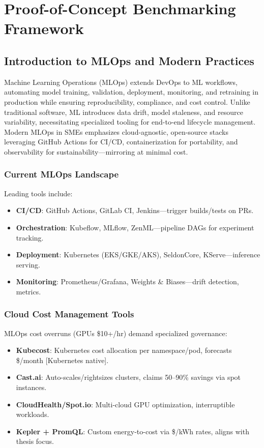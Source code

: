 \chapter{Proof-of-Concept Benchmarking Framework}

\section{Introduction to MLOps and Modern Practices}

Machine Learning Operations (MLOps) extends DevOps to ML workflows, automating model training, validation, deployment, monitoring, and retraining in production while ensuring reproducibility, compliance, and cost control. Unlike traditional software, ML introduces data drift, model staleness, and resource variability, necessitating specialized tooling for end-to-end lifecycle management. Modern MLOps in SMEs emphasizes cloud-agnostic, open-source stacks leveraging GitHub Actions for CI/CD, containerization for portability, and observability for sustainability—mirroring at minimal cost.

\subsection{Current MLOps Landscape}

Leading tools include:
\begin{itemize}
    \item \textbf{CI/CD}: GitHub Actions, GitLab CI, Jenkins—trigger builds/tests on PRs.
    \item \textbf{Orchestration}: Kubeflow, MLflow, ZenML—pipeline DAGs for experiment tracking.
    \item \textbf{Deployment}: Kubernetes (EKS/GKE/AKS), SeldonCore, KServe—inference serving.
    \item \textbf{Monitoring}: Prometheus/Grafana, Weights \& Biases—drift detection, metrics.
\end{itemize}

\subsection{Cloud Cost Management Tools}

MLOps cost overruns (GPUs \$10+/hr) demand specialized governance:
\begin{itemize}
    \item \textbf{Kubecost}: Kubernetes cost allocation per namespace/pod, forecasts \$/month [Kubernetes native].
    \item \textbf{Cast.ai}: Auto-scales/rightsizes clusters, claims 50--90\% savings via spot instances.
    \item \textbf{CloudHealth/Spot.io}: Multi-cloud GPU optimization, interruptible workloads.
    \item \textbf{Kepler + PromQL}: Custom energy-to-cost via \$/kWh rates, aligns with thesis focus.
\end{itemize}

